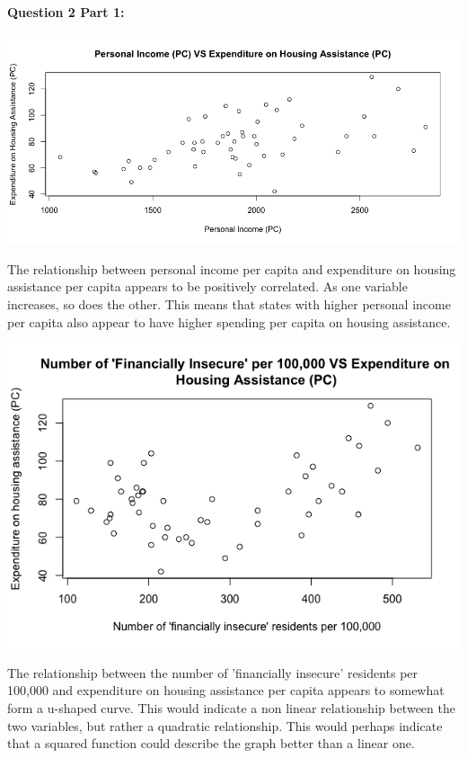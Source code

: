 \documentclass[12pt,letterpaper]{article}
\begin{document}
\newpage
\noindent
\textbf{Question 2 Part 1:}


\includegraphics[width=150mm]{Rplot X1 against Y}

\noindent
The relationship between personal income per capita and expenditure on housing assistance per capita appears to be positively correlated. As one variable increases, so does the other. This means that states with higher personal income per capita also appear to have higher spending per capita on housing assistance.
\\\vspace{.5cm}



\newpage

\includegraphics[width=150mm]{Rplot X2 against Y}

\noindent
The relationship between the number of 'financially insecure' residents per 100,000 and expenditure on housing assistance per capita appears to somewhat form a u-shaped curve. This would indicate a non linear relationship between the two variables, but rather a quadratic relationship. This would perhaps indicate that a squared function could describe the graph better than a linear one.
\\\vspace{.5cm}
\end{document}
